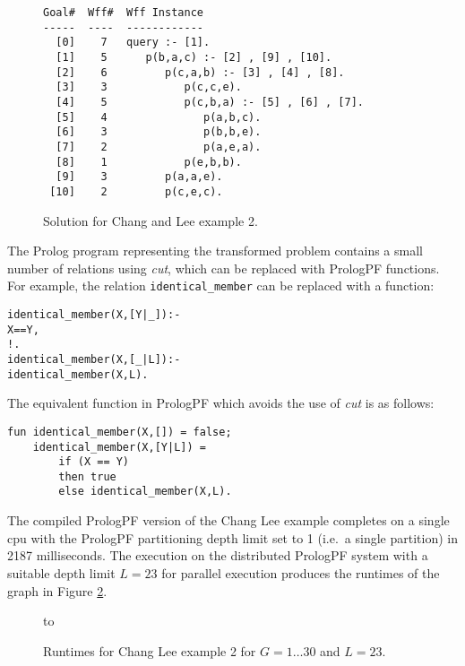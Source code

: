 \begin{figure}[h]
\begin{verbatim}
Goal#  Wff#  Wff Instance
-----  ----  ------------
  [0]    7   query :- [1].
  [1]    5      p(b,a,c) :- [2] , [9] , [10].
  [2]    6         p(c,a,b) :- [3] , [4] , [8].
  [3]    3            p(c,c,e).
  [4]    5            p(c,b,a) :- [5] , [6] , [7].
  [5]    4               p(a,b,c).
  [6]    3               p(b,b,e).
  [7]    2               p(a,e,a).
  [8]    1            p(e,b,b).
  [9]    3         p(a,a,e).
 [10]    2         p(c,e,c).
\end{verbatim}
\caption{Solution for Chang and Lee example 2.}
\label{cl_proof}
\end{figure}

The Prolog program representing the transformed problem contains a small number of
relations using \textit{cut}, which can be replaced with PrologPF functions.  For
example, the relation \texttt{identical\_{}member} can be replaced with a function:
\vspace{2mm}\\
\begin{minipage}[h]{\textwidth}  %
\begin{alltt}
identical_member(X,[Y|_])  :-
      X == Y,
      !.                        % note presence of cut
identical_member(X,[_|L]) :-
      identical_member(X,L).
\end{alltt}
\end{minipage}

The equivalent function in PrologPF which avoids the use of \textit{cut} is as
follows: 
\begin{verbatim}
fun identical_member(X,[]) = false;
    identical_member(X,[Y|L]) =
        if (X == Y)
        then true
        else identical_member(X,L).
\end{verbatim}
The compiled PrologPF version of the Chang Lee example completes on a single cpu with
the PrologPF partitioning depth limit set to 1 (i.e.\ a single partition) in
2187 milliseconds.  The execution on the distributed PrologPF system with a
suitable depth limit $L=23$ for parallel execution produces the
runtimes of the graph in Figure \ref{changlee2_L_23_runtime}.

\begin{figure}[htb]
\vspace{5mm} \hbox to 
\caption{Runtimes for Chang Lee example 2 for $G=1\ldots 30$ and $L=23$.}
\vspace{5mm}
\label{changlee2_L_23_runtime}
\end{figure}


